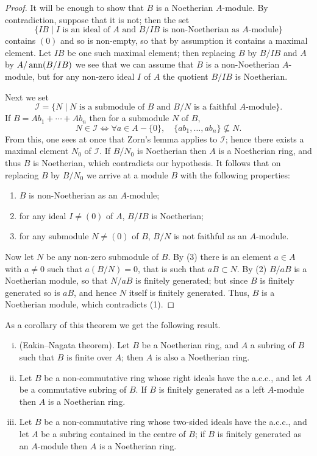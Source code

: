 \begin{proof}
It will be enough to show that $B$ is a Noetherian $A$-module. By
contradiction, suppose that it is not; then the set
\[
  \{IB \mid I \text{ is an ideal of } A \text{ and } B/IB \text{ is non-Noetherian as } A\text{-module}\}
\]
contains $(0)$ and so is non-empty, so that by assumption it contains a
maximal element. Let $IB$ be one such maximal element; then replacing $B$
by $B/IB$ and $A$ by $A/\operatorname{ann}(B/IB)$ we see that we can assume that $B$ is a
non-Noetherian $A$-module, but for any non-zero ideal $I$ of $A$ the quotient
$B/IB$ is Noetherian.

Next we set
\[
  \mathcal{I} = \{N \mid N \text{ is a submodule of } B \text{ and } B/N \text{ is a faithful } A\text{-module}\}.
\]
If $B = Ab_1 + \cdots + Ab_n$ then for a submodule $N$ of $B$,
\[
  N \in \mathcal{I} \iff \forall a \in A - \{0\}, \quad \{ab_1, \ldots, ab_n\} \nsubseteq N.
\]
From this, one sees at once that Zorn's lemma applies to $\mathcal{I}$; hence there
exists a maximal element $N_0$ of $\mathcal{I}$. If $B/N_0$ is Noetherian then $A$ is a
Noetherian ring, and thus $B$ is Noetherian, which contradicts our
hypothesis. It follows that on replacing $B$ by $B/N_0$ we arrive at a module
$B$ with the following properties:
\begin{enumerate}[(1)]
  \item $B$ is non-Noetherian as an $A$-module;
  \item for any ideal $I \neq (0)$ of $A$, $B/IB$ is Noetherian;
  \item for any submodule $N \neq (0)$ of $B$, $B/N$ is not faithful as an $A$-module.
\end{enumerate}
Now let $N$ be any non-zero submodule of $B$. By (3) there is an element
$a \in A$ with $a \neq 0$ such that $a(B/N) = 0$, that is such that $aB \subset N$. By (2)
$B/aB$ is a Noetherian module, so that $N/aB$ is finitely generated; but since
$B$ is finitely generated so is $aB$, and hence $N$ itself is finitely generated.
Thus, $B$ is a Noetherian module, which contradicts (1).
\end{proof}

As a corollary of this theorem we get the following result.

\begin{theorem}\label{thm:3.7}
\begin{enumerate}[(i)]
  \item (Eakin--Nagata theorem). Let $B$ be a Noetherian ring, and $A$ a subring
        of $B$ such that $B$ is finite over $A$; then $A$ is also a Noetherian ring.
  \item Let $B$ be a non-commutative ring whose right ideals have the a.c.c.,
        and let $A$ be a commutative subring of $B$. If $B$ is finitely generated as a
        left $A$-module then $A$ is a Noetherian ring.
  \item Let $B$ be a non-commutative ring whose two-sided ideals have the
        a.c.c., and let $A$ be a subring contained in the centre of $B$; if $B$ is finitely
        generated as an $A$-module then $A$ is a Noetherian ring.
\end{enumerate}
\end{theorem}

